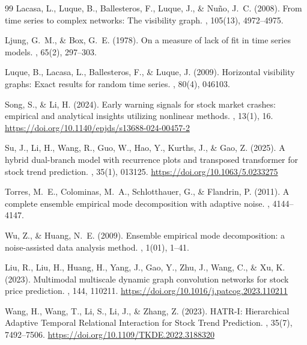 \documentclass[11pt,a4paper]{article}
\begin{document}
\begin{thebibliography}{99}
Lacasa, L., Luque, B., Ballesteros, F., Luque, J., \& Nuño, J.~C. (2008).
\newblock From time series to complex networks: The visibility graph.
, 105(13), 4972--4975.

Ljung, G.~M., \& Box, G.~E. (1978).
\newblock On a measure of lack of fit in time series models.
, 65(2), 297--303.

Luque, B., Lacasa, L., Ballesteros, F., \& Luque, J. (2009).
\newblock Horizontal visibility graphs: Exact results for random time series.
, 80(4), 046103.

Song, S., \& Li, H. (2024).
\newblock Early warning signals for stock market crashes: empirical and analytical insights utilizing nonlinear methods.
, 13(1), 16.
\newblock \url{https://doi.org/10.1140/epjds/s13688-024-00457-2}

Su, J., Li, H., Wang, R., Guo, W., Hao, Y., Kurths, J., \& Gao, Z. (2025).
\newblock A hybrid dual-branch model with recurrence plots and transposed transformer for stock trend prediction.
, 35(1), 013125.
\newblock \url{https://doi.org/10.1063/5.0233275}

Torres, M.~E., Colominas, M.~A., Schlotthauer, G., \& Flandrin, P. (2011).
\newblock A complete ensemble empirical mode decomposition with adaptive noise.
, 4144--4147.

Wu, Z., \& Huang, N.~E. (2009).\textbf{}
\newblock Ensemble empirical mode decomposition: a noise-assisted data analysis method.
, 1(01), 1--41.

Liu, R., Liu, H., Huang, H., Yang, J., Gao, Y., Zhu, J., Wang, C., \& Xu, K. (2023).
\newblock Multimodal multiscale dynamic graph convolution networks for stock price prediction.
, 144, 110211.
\newblock \url{https://doi.org/10.1016/j.patcog.2023.110211}

Wang, H., Wang, T., Li, S., Li, J., \& Zhang, Z. (2023).
\newblock HATR-I: Hierarchical Adaptive Temporal Relational Interaction for Stock Trend Prediction.
, 35(7), 7492--7506.
\newblock \url{https://doi.org/10.1109/TKDE.2022.3188320}


\end{thebibliography}
\end{document}
